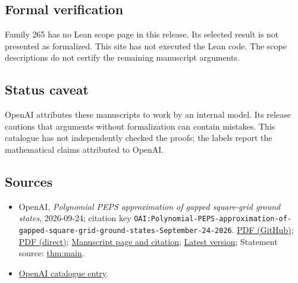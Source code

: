\documentclass[11pt]{article}
\begin{document}
\subsection{Formal verification}
Family 265 has no Lean scope page in this release. Its selected result is not presented as formalized. This site has not executed the Lean code. The scope descriptions do not certify the remaining manuscript arguments.

\subsection{Status caveat}
OpenAI attributes these manuscripts to work by an internal model. Its release cautions that arguments without formalization can contain mistakes. This catalogue has not independently checked the proofs; the labels report the mathematical claims attributed to OpenAI.

\subsection{Sources}
\begin{itemize}
\item OpenAI, \emph{Polynomial PEPS approximation of gapped square-grid ground states}, 2026-09-24; citation key \texttt{OAI:Polynomial-PEPS-approximation-of-gapped-square-grid-ground-states-September-24-2026}. \href{https://github.com/openai/math/blob/adc7f1241b42e322a6451854ab7e4b4c146bf78a/preprints/Polynomial-PEPS-approximation-of-gapped-square-grid-ground-states-September-24-2026/paper.pdf}{PDF (GitHub)}; \href{https://github.com/openai/math/raw/adc7f1241b42e322a6451854ab7e4b4c146bf78a/preprints/Polynomial-PEPS-approximation-of-gapped-square-grid-ground-states-September-24-2026/paper.pdf}{PDF (direct)}; \href{https://github.com/openai/math/blob/adc7f1241b42e322a6451854ab7e4b4c146bf78a/preprints/Polynomial-PEPS-approximation-of-gapped-square-grid-ground-states-September-24-2026/README.md}{Manuscript page and citation}; \href{https://github.com/openai/math/blob/main/preprints/Polynomial-PEPS-approximation-of-gapped-square-grid-ground-states-September-24-2026/paper.pdf}{Latest version}; Statement source: \href{https://github.com/openai/math/blob/adc7f1241b42e322a6451854ab7e4b4c146bf78a/preprints/Polynomial-PEPS-approximation-of-gapped-square-grid-ground-states-September-24-2026/build/sections/00-introduction.tex\#L36}{thm:main}.
\item \href{https://github.com/openai/math/blob/adc7f1241b42e322a6451854ab7e4b4c146bf78a/CONTENTS.md}{OpenAI catalogue entry}.
\end{itemize}
\end{document}
